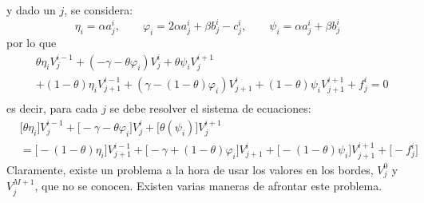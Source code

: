 y dado un $j$, se considera:
\begin{equation*}
    \eta_i = \alpha a_j^i, \qquad \varphi_i = 2\alpha a_j^i  + \beta b_j^i - c_j^i, \qquad \psi_i = \alpha a_j^i + \beta b_j^i
\end{equation*}
por lo que
\begin{align*}
    &\theta\eta_i V_j^{i-1} +\left( -\gamma - \theta \varphi_i \right)V_j^i +\theta\psi_i V_j^{i+1} \\
    &+(1-\theta)\eta_i V_{j+1}^{i-1} +\left( \gamma - (1-\theta) \varphi_i \right)V_{j+1}^i +(1-\theta)\psi_i V_{j+1}^{i+1} + f_j^i = 0 \\
\end{align*}
es decir, para cada $j$ se debe resolver el sistema de ecuaciones:
\begin{align}
    &\bigg[ \theta\eta_i \bigg] V_j^{i-1} + \bigg[ -\gamma - \theta \varphi_i \bigg] V_j^i + \bigg[ \theta\left( \psi_i \right) \bigg] V_j^{i+1} \nonumber \\
    &= \bigg[ - (1-\theta)\eta_i \bigg] V_{j+1}^{i-1} + \bigg[ - \gamma + (1-\theta) \varphi_i \bigg] V_{j+1}^i + \bigg[ - (1-\theta)\psi_i \bigg] V_{j+1}^{i+1} + \bigg[ - f_j^i \bigg] \label{eq:DF_theta_general}
\end{align}
Claramente, existe un problema a la hora de usar los valores en los bordes, $V_j^0$ y $V_j^{M+1}$, que no se conocen. Existen varias maneras de afrontar este problema.



